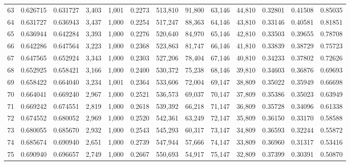 \begin{tabular}{rrrrrrrrrrrrr}
63  &  0.626715 &  0.631727 &   3,403 &  1,001 &                                     0.2273 &  513,810 &   91,800 &   63,146 &   44,810 &  0.32801 &  0.41508 &  0.85035 \\
64  &  0.631727 &  0.636943 &   3,437 &  1,000 &                                     0.2254 &  517,247 &   88,363 &   64,146 &   43,810 &  0.33146 &  0.40581 &  0.81851 \\
65  &  0.636944 &  0.642284 &   3,393 &  1,000 &                                     0.2276 &  520,640 &   84,970 &   65,146 &   42,810 &  0.33503 &  0.39655 &  0.78708 \\
66  &  0.642286 &  0.647564 &   3,223 &  1,000 &                                     0.2368 &  523,863 &   81,747 &   66,146 &   41,810 &  0.33839 &  0.38729 &  0.75723 \\
67  &  0.647565 &  0.652924 &   3,343 &  1,000 &                                     0.2303 &  527,206 &   78,404 &   67,146 &   40,810 &  0.34233 &  0.37802 &  0.72626 \\
68  &  0.652925 &  0.658421 &   3,166 &  1,000 &                                     0.2400 &  530,372 &   75,238 &   68,146 &   39,810 &  0.34603 &  0.36876 &  0.69693 \\
69  &  0.658422 &  0.664040 &   3,234 &  1,001 &                                     0.2364 &  533,606 &   72,004 &   69,147 &   38,809 &  0.35022 &  0.35949 &  0.66698 \\
70  &  0.664041 &  0.669240 &   2,967 &  1,000 &                                     0.2521 &  536,573 &   69,037 &   70,147 &   37,809 &  0.35386 &  0.35023 &  0.63949 \\
71  &  0.669242 &  0.674551 &   2,819 &  1,000 &                                     0.2618 &  539,392 &   66,218 &   71,147 &   36,809 &  0.35728 &  0.34096 &  0.61338 \\
72  &  0.674552 &  0.680052 &   2,969 &  1,000 &                                     0.2520 &  542,361 &   63,249 &   72,147 &   35,809 &  0.36150 &  0.33170 &  0.58588 \\
73  &  0.680055 &  0.685670 &   2,932 &  1,000 &                                     0.2543 &  545,293 &   60,317 &   73,147 &   34,809 &  0.36593 &  0.32244 &  0.55872 \\
74  &  0.685674 &  0.690940 &   2,651 &  1,000 &                                     0.2739 &  547,944 &   57,666 &   74,147 &   33,809 &  0.36960 &  0.31317 &  0.53416 \\
75  &  0.690940 &  0.696657 &   2,749 &  1,000 &                                     0.2667 &  550,693 &   54,917 &   75,147 &   32,809 &  0.37399 &  0.30391 &  0.50870 \\

\end{tabular}
